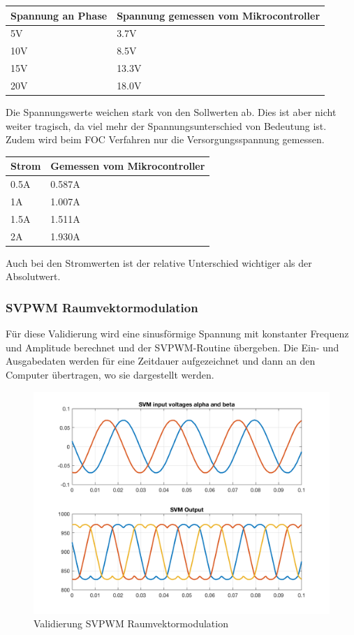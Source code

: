 \begin{center}
	\begin{tabular}{l|l} 
		Spannung an Phase & Spannung gemessen vom Mikrocontroller \\ \hline
		5V & 3.7V\\ \hline
		10V & 8.5V\\ \hline
		15V & 13.3V\\ \hline
		20V & 18.0V\\ \hline
	\end{tabular} 
	\label{tab:spannsw}
\end{center}

Die Spannungswerte weichen stark von den Sollwerten ab. Dies ist aber nicht weiter tragisch, da viel mehr der Spannungsunterschied von Bedeutung ist. Zudem wird beim FOC Verfahren nur die Versorgungsspannung gemessen.

\begin{center}
	\begin{tabular}{l|l}
		Strom & Gemessen vom Mikrocontroller \\ \hline
		0.5A & 0.587A\\ \hline
		1A & 1.007A\\ \hline
		1.5A & 1.511A\\ \hline
		2A & 1.930A\\ \hline
	\end{tabular} 
	\label{tab:stromsw}
\end{center}

Auch bei den Stromwerten ist der relative Unterschied wichtiger als der Absolutwert.

\subsubsection*{SVPWM Raumvektormodulation}
Für diese Validierung wird eine sinusförmige Spannung mit konstanter Frequenz und Amplitude berechnet und der SVPWM-Routine übergeben. Die Ein- und Ausgabedaten werden für eine Zeitdauer aufgezeichnet und dann an den Computer übertragen, wo sie dargestellt werden.

\begin{figure} [H]
	\centering
	\includegraphics[width=0.8\linewidth]{images/valmcsvm.png}
	\caption{Validierung SVPWM Raumvektormodulation}
	\label{fig:svpwm}
\end{figure}

